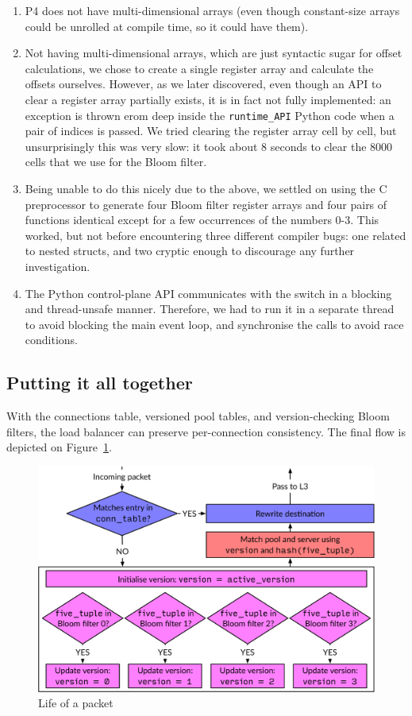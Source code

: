 \documentclass[11pt,oneside,a4paper]{article}
\begin{document}
\begin{enumerate}
\item P4 does not have multi-dimensional arrays (even though constant-size
    arrays could be unrolled at compile time, so it could have them).
\item Not having multi-dimensional arrays, which are just syntactic sugar for
    offset calculations, we chose to create a single register array and
    calculate the offsets ourselves.
    However, as we later discovered, even though an API to clear a register array
    partially exists, it is in fact not fully implemented: an exception is thrown
    erom deep inside the \texttt{runtime\_API} Python code when a pair of indices is
    passed.
    We tried clearing the register array cell by cell, but unsurprisingly this
    was very slow: it took about 8 seconds to clear the 8000 cells that we use
    for the Bloom filter.
\item Being unable to do this nicely due to the above, we settled on using the C
    preprocessor to generate four Bloom filter register arrays and four pairs of
    functions identical except for a few occurrences of the numbers 0-3.
    This worked, but not before encountering three different compiler bugs: one
    related to nested structs, and two cryptic enough to discourage any further
    investigation.
\item The Python control-plane API communicates with the switch in a blocking and
    thread-unsafe manner.
    Therefore, we had to run it in a separate thread to avoid blocking the main
    event loop, and synchronise the calls to avoid race conditions.
\end{enumerate}

\subsection{Putting it all together}

With the connections table, versioned pool tables, and version-checking Bloom
filters, the load balancer can preserve per-connection consistency.
The final flow is depicted on Figure~\ref{fig:life-of-a-packet}.

\begin{figure}[h]
\centering
\includegraphics[width=.75\textwidth]{figures/life-of-a-packet.pdf}
\caption{Life of a packet}
\label{fig:life-of-a-packet}
\end{figure}
\end{document}
